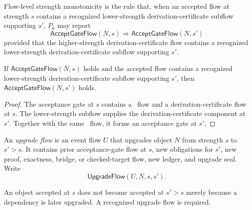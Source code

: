 \begin{definition}
\label{def:deriv-accept-strength-monotonicity}
Flow-level strength monotonicity is the rule that, when an accepted flow at strength $s$ contains a recognized lower-strength derivation-certificate subflow supporting $s'$, $P_6$ may report
$$
  \mathsf{AcceptGateFlow}(N,s)
  \Rightarrow
  \mathsf{AcceptGateFlow}(N,s')
$$
provided that the higher-strength derivation-certificate flow contains a recognized lower-strength derivation-certificate subflow supporting $s'$.
\end{definition}

\begin{theorem}
\label{thm:deriv-accept-strength-monotonicity}
If $\mathsf{AcceptGateFlow}(N,s)$ holds and the accepted flow contains a recognized lower-strength derivation-certificate subflow supporting $s'$, then $\mathsf{AcceptGateFlow}(N,s')$ holds.
\end{theorem}

\begin{proof}
The acceptance gate at $s$ contains a \NameCert\ flow and a derivation-certificate flow at $s$. The lower-strength subflow supplies the derivation-certificate component at $s'$. Together with the same \NameCert\ flow, it forms an acceptance gate at $s'$.
\end{proof}

\begin{definition}
\label{def:deriv-accept-upgrade-flow}
An \emph{upgrade flow} is an event flow $U$ that upgrades object $N$ from strength $s$ to $s'>s$. It contains prior acceptance-gate flow at $s$, new obligations for $s'$, new proof, exactness, bridge, or checked-target flow, new ledger, and upgrade seal. Write
$$
  \mathsf{UpgradeFlow}(U,N,s,s').
$$
\end{definition}

\begin{principle}
\label{prin:deriv-accept-no-retroactive-promotion}
An object accepted at $s$ does not become accepted at $s'>s$ merely because a dependency is later upgraded. A recognized upgrade flow is required.
\end{principle}

